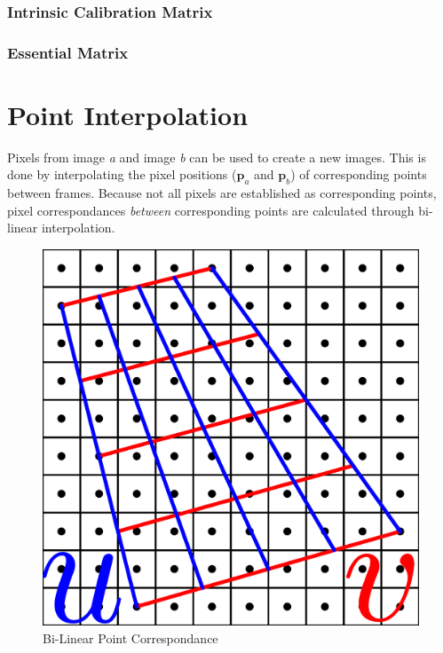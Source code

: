 \documentclass{report}
\begin{document}
\subsection*{Intrinsic Calibration Matrix}

\subsection*{Essential Matrix}

%

\chapter{Point Interpolation}
\par
Pixels from image \textit{a} and image \textit{b} can be used to create a new images. This is done by interpolating the pixel positions ($\mathbf{p}_{a}$ and $\mathbf{p}_{b}$) of corresponding points between frames. Because not all pixels are established as corresponding points, pixel correspondances \textit{between} corresponding points are calculated through bi-linear interpolation. 
\begin{figure}[htbp]
	\centering
%	
	\includegraphics[scale=0.25]{BiLinear_Point_Correspondance}
	\caption{Bi-Linear Point Correspondance}
\end{figure}
\end{document}
